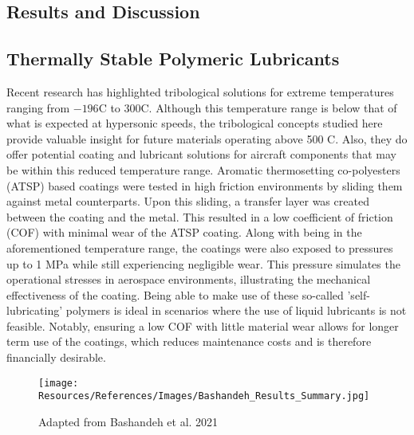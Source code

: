 \documentclass[12pt]{article}
\begin{document}
\begin{multicols}{2}
\section{Results and Discussion}

\subsection{Thermally Stable Polymeric Lubricants}

\indent Recent research has highlighted tribological solutions for extreme temperatures ranging from $-196$\degree C to $300$\degree C. Although this temperature range is below that of what is expected at hypersonic speeds, the tribological concepts studied here provide valuable insight for future materials operating above 500 \degree C. Also, they do offer potential coating and lubricant solutions for aircraft components that may be within this reduced temperature range. Aromatic thermosetting co-polyesters (ATSP) based coatings were tested in high friction environments by sliding them against metal counterparts. Upon this sliding, a transfer layer was created between the coating and the metal. This resulted in a low coefficient of friction (COF) with minimal wear of the ATSP coating. Along with being in the aforementioned temperature range, the coatings were also exposed to pressures up to 1 MPa while still experiencing negligible wear. \citep{Bashandeh2021} This pressure simulates the operational stresses in aerospace environments, illustrating the mechanical effectiveness of the coating. Being able to make use of these so-called 'self-lubricating' polymers is ideal in scenarios where the use of liquid lubricants is not feasible. Notably, ensuring a low COF with little material wear allows for longer term use of the coatings, which reduces maintenance costs and is therefore financially desirable.

\begin{figure}[H]
    \centering
    \texttt{[image: Resources/References/Images/Bashandeh\_Results\_Summary.jpg]}
    \caption{\scriptsize{Adapted from Bashandeh et al. 2021 \citep{Bashandeh2021}}}
    \label{fig:Bashandeh-Summary}
\end{figure}


\end{multicols}
\end{document}
